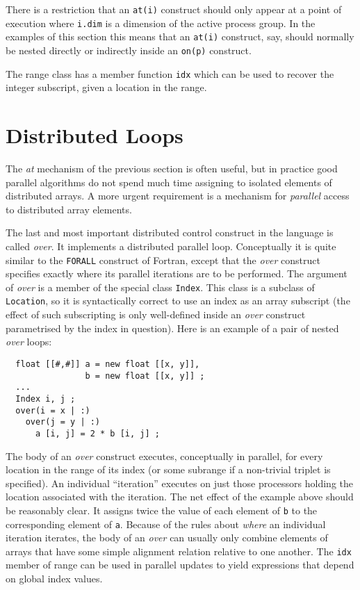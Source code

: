 There is a restriction that an {\tt at(i)} construct should
only appear at a point of execution where {\tt i.dim} is a dimension of
the active process group.  In the examples of this section this means
that an {\tt at(i)} construct, say, should normally be nested directly
or indirectly inside an {\tt on(p)} construct.

The range class has a member function {\tt idx}
which can be used to recover the integer subscript, given a
location in the range.

\section{Distributed Loops}

The {\em at} mechanism of the previous section is often useful, but in
practice good parallel algorithms do not spend much time assigning to
isolated elements of distributed arrays.  A more urgent requirement
is a mechanism for {\em parallel} access to distributed array
elements.

The last and most important distributed control construct in the language
is called {\em over}.
It implements a distributed parallel loop.  Conceptually it is quite
similar to the {\tt FORALL} construct of Fortran, except that the
{\em over} construct specifies exactly where its parallel iterations
are to be performed.
The argument of {\em over} is a member of the special class {\tt Index}.
This class is a subclass of {\tt Location}, so it is syntactically
correct to use an index as an array subscript (the effect
of such subscripting is only well-defined inside an {\em over} construct
parametrised by the index in question).  Here is an example of
a pair of nested {\em over} loops:
\small
\begin{verbatim}
  float [[#,#]] a = new float [[x, y]],
                b = new float [[x, y]] ;
  ...
  Index i, j ;
  over(i = x | :)
    over(j = y | :)
      a [i, j] = 2 * b [i, j] ;
\end{verbatim}
\normalsize
The body of an {\em over} construct executes, conceptually in parallel,
for every location in the range of its index (or some subrange if a
non-trivial triplet is specified).  An individual
``iteration'' executes on just those processors holding the location
associated with the iteration.
The net effect of the example above should be reasonably
clear.  It assigns twice the value of each element of {\tt b} to the
corresponding element of {\tt a}.  Because of the rules about {\em
where} an individual iteration iterates, the body of an {\em over} can
usually only combine elements of arrays that have some simple
alignment relation relative to one another.  The {\tt idx} member of
range can be used in parallel updates to yield expressions that depend
on global index values.

